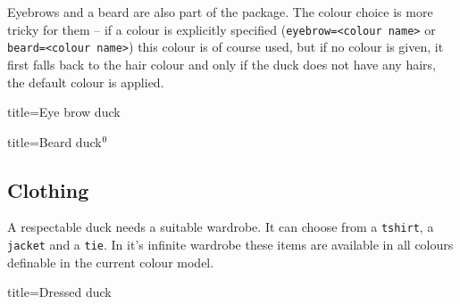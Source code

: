 \documentclass[parskip=half]{scrartcl}
\begin{document}
Eyebrows and a beard are also part of the package. The colour choice is more tricky for them -- if a colour is explicitly specified (\lstinline|eyebrow=<colour name>| or \lstinline|beard=<colour name>|) this colour is of course used, but if no colour is given, it first falls back to the hair colour and only if the duck does not have any hairs, the default colour is applied.

\begin{tcblisting}{title={Eye brow duck}}
\begin{tikzpicture}
	\duck[eyebrow]
\end{tikzpicture}
\begin{tikzpicture}
	\duck[longhair=blue, 
		eyebrow]
\end{tikzpicture}

\begin{tikzpicture}
	\duck[crazyhair=red, 
		eyebrow=blue]
\end{tikzpicture}
\end{tcblisting}

\addtocounter{footnote}{1}
\begin{tcblisting}{title={Beard duck$^\thefootnote$}}
\begin{tikzpicture}
	\duck[beard=white!80!brown]
\end{tikzpicture}
\begin{tikzpicture}
	\duck[recedinghair=white,beard]
\end{tikzpicture}
\end{tcblisting}

\subsection{Clothing}

A respectable duck needs a suitable wardrobe. It can choose from a \lstinline|tshirt|, a \lstinline|jacket| and a \lstinline|tie|. In it's infinite wardrobe these items are available in all colours definable in the current colour model.

\begin{tcblisting}{title={Dressed duck}}
\begin{tikzpicture}
	\duck[tshirt]
\end{tikzpicture}
\begin{tikzpicture}
	\duck[jacket]
\end{tikzpicture}

\begin{tikzpicture}
	\duck[tie]
\end{tikzpicture}
\begin{tikzpicture}
	\duck[cape]
\end{tikzpicture}

\begin{tikzpicture}
	\duck[tshirt=lightgray, 
			jacket=blue!50!black, 
			tie=blue!80!black, 
			shorthair]
\end{tikzpicture}
\end{tcblisting}
\end{document}
